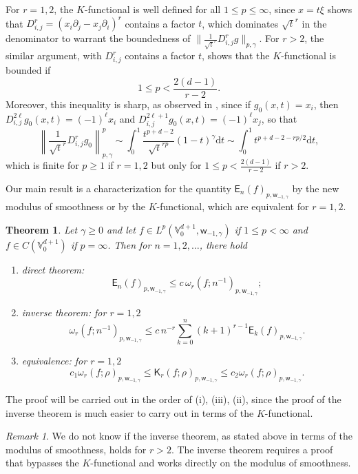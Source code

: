 \documentclass{amsart}
\newtheorem{thm}{Theorem}[section]
\theoremstyle{remark}
\newtheorem{rem}{Remark}[section]\newtheorem*{notation}{Notation}
\def\d{\mathrm{d}}
\def\g{{\gamma}}
\def\o{{\omega}}
\def\VV{{\mathbb V}}
\def\d{\mathrm{d}}
\def\sE{{\mathsf E}}
\def\sK{{\mathsf K}}
\def\sw{{\mathsf w}}
\def\g{{\gamma}}
\def\o{{\omega}}
\def\VV{{\mathbb V}}
\def\f{\frac}
\def\f{\frac}
\begin{document}
For $r = 1, 2$, the $K$-functional is well defined for all $1 \le p\le \infty$, since $x = t\xi$ shows that 
$D_{i,j}^r = (x_i \partial_j - x_j \partial_i)^r$ contains a factor $t$, which dominates $\sqrt{t}^r$ in the 
denominator to warrant the boundedness of $\| \f{1}{\sqrt{t}^r}D_{i,j}^r g\|_{p, \g}$. For $r > 2$, the 
similar argument, with $D_{i,j}^r$ contains a factor $t$, shows that the $K$-functional is bounded if 
$$
    1 \le p < \frac{2(d-1)}{r -2}.
$$
Moreover, this inequality is sharp, as observed in \cite{X23}, since if $g_0(x,t) = x_i$, then 
$D_{i,j}^{2\ell} g_0(x,t) = (-1)^\ell x_i$ 
and $D_{i,j}^{2\ell+1} g_0(x,t) = (-1)^\ell x_j$, so that 
$$
  \left\| \f{1}{\sqrt{t}^r}D_{i,j}^r g_0 \right\|_{p, \g}^p \sim \int_0^1 \frac{t^{p +d-2}}{\sqrt{t}^{r p}} (1-t)^\g \d t
   \sim \int_0^1 t^{p+d-2-rp/2} \d t,
$$
which is finite for $p \ge 1$ if $r =1,2$ but only for $1 \le p < \frac{2(d-1)}{r -2}$ if $r > 2$.  

Our main result is a characterization for the quantity $\sE_n(f)_{p, \sw_{-1,\g}}$ by the new
modulus of smoothness or by the $K$-functional, which are equivalent for $r =1,2$.  

\begin{thm}\label{main-thmV0}
Let $\g \ge 0$ and let $f \in L^p(\VV_0^{d+1}, \sw_{-1,\g})$ if $1 \le p < \infty$ and 
$f\in C(\VV_0^{d+1})$ if $p = \infty$. Then for   $n =1,2,\ldots$, there hold 
\begin{enumerate} [\rm (i)]
\item  direct theorem:
$$
    \sE_n(f)_{p,\sw_{-1,\g}} \le c \, \o_r(f;  n^{-1})_{p,\sw_{-1,\g}};
$$
\item inverse theorem:   for $r =1, 2$  
$$
   \o_r(f; n^{-1})_{p,\sw_{-1,\g}} \le c \,n^{-r} \sum_{k=0}^n (k+1)^{r-1}\sE_k(f)_{p,\sw_{-1,\g}}.
$$
\item equivalence:      for $r =1, 2$  
$$
     c_1 \o_r(f; \rho)_{p,\sw_{-1,\g}} \le \sK_r(f; \rho)_{p,\sw_{-1,\g}} \le c_2 \o_r(f; \rho)_{p,\sw_{-1,\g}}.
$$
\end{enumerate}
\end{thm}

The proof will be carried out in the order of (i), (iii), (ii), since the proof of the inverse theorem is much 
easier to carry out in terms of the $K$-functional. 

\begin{rem}
We do not know if the inverse theorem, as stated above in terms of the modulus of smoothness, holds 
for $r > 2$. The inverse theorem requires a proof that bypasses the $K$-functional and works directly 
on the modulus of smoothness. 
\end{rem}
\end{document}
